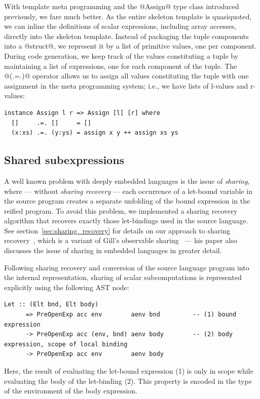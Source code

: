 With template meta programming and the @Assign@ type class introduced
previously, we fare much better. As the entire skeleton template is quasiquoted,
we can inline the definitions of scalar expressions, including array accesses,
directly into the skeleton template. Instead of packaging the tuple components
into a @struct@, we represent it by a list of primitive values, one per
component. During code generation, we keep track of the values constituting a
tuple by maintaining a list of expressions, one for each component of the tuple.
The @(.=.)@ operator allows us to assign all values constituting the tuple
with one assignment in the meta programming system; i.e., we have lists of
l-values and r-values:
%
\begin{lstlisting}[style=haskell]
instance Assign l r => Assign [l] [r] where
  []     .=. []     = []
  (x:xs) .=. (y:ys) = assign x y ++ assign xs ys
\end{lstlisting}


\subsection{Shared subexpressions}
\label{sec:shared_subexpressions}

A well known problem with deeply embedded languages is the issue of
\emph{sharing}, where --- without \emph{sharing recovery} --- each occurrence of
a let-bound variable in the source program creates a separate unfolding of the
bound expression in the reified program. To avoid this problem, we implemented a
sharing recovery algorithm that recovers exactly those let-bindings used in the
source language. See section~\ref{sec:sharing_recovery} for details on our
approach to sharing recovery~\cite{McDonell:2013wi}, which is a variant of
Gill's observable sharing~\cite{Gill:2009dx} --- his paper also discusses the
issue of sharing in embedded languages in greater detail.

Following sharing recovery and conversion of the source language program into
the internal  representation, sharing of scalar
subcomputations is represented explicitly using the following AST node:
%
\begin{lstlisting}[style=haskell]
  Let :: (Elt bnd, Elt body)
      => PreOpenExp acc env        aenv bnd         -- (1) bound expression
      -> PreOpenExp acc (env, bnd) aenv body        -- (2) body expression, scope of local binding
      -> PreOpenExp acc env        aenv body
\end{lstlisting}
%
Here, the result of evaluating the let-bound expression (1) is only in scope
while evaluating the body of the let-binding (2). This property is encoded in
the type of the environment of the body expression.

